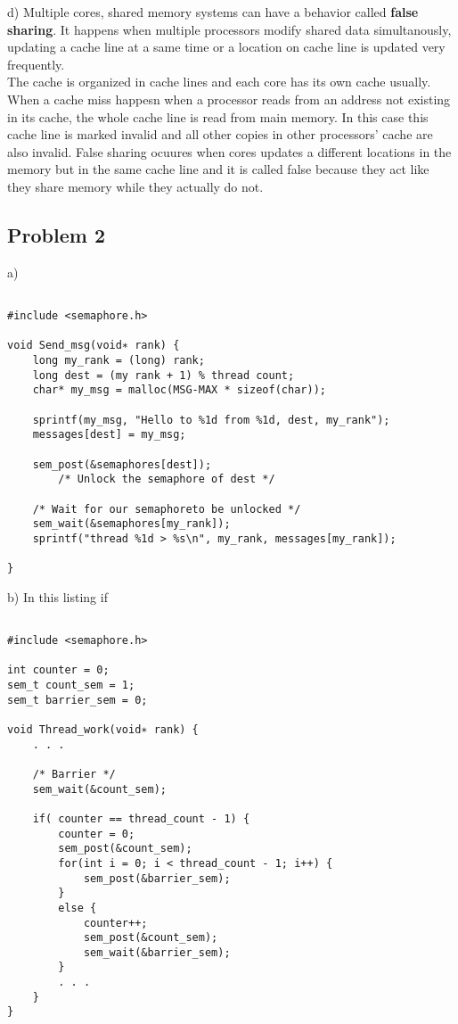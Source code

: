 \documentclass{article}
\begin{document}
\begin{flushleft}
d) Multiple cores, shared memory systems can have a behavior called \textbf{false sharing}. It happens when multiple processors modify shared data simultanously, updating a cache line at a same time or a location on cache line is updated very frequently. \\ 
The cache is organized in cache lines and each core has its own cache usually. When a cache miss happesn when a processor reads from an address not existing in its cache, the whole cache line is read from main memory. In this case this cache line is marked invalid and all other copies in other processors' cache are also invalid. False sharing ocuures when cores updates a different locations in the memory but in the same cache line and it is called false because they act like they share memory while they actually do not.
\end{flushleft}
\newpage

\subsection{Problem 2}
a)
\begin{lstlisting}

#include <semaphore.h>

void Send_msg(void∗ rank) {
    long my_rank = (long) rank;
    long dest = (my rank + 1) % thread count;
    char* my_msg = malloc(MSG-MAX * sizeof(char));

    sprintf(my_msg, "Hello to %1d from %1d, dest, my_rank");
    messages[dest] = my_msg;

    sem_post(&semaphores[dest]);
        /* Unlock the semaphore of dest */

    /* Wait for our semaphoreto be unlocked */    
    sem_wait(&semaphores[my_rank]);
    sprintf("thread %1d > %s\n", my_rank, messages[my_rank]);

}

\end{lstlisting}
\newpage
b) In this listing if 
\begin{lstlisting}

#include <semaphore.h>

int counter = 0;
sem_t count_sem = 1;
sem_t barrier_sem = 0;

void Thread_work(void∗ rank) {
    . . .

    /* Barrier */
    sem_wait(&count_sem);

    if( counter == thread_count - 1) {
        counter = 0;
        sem_post(&count_sem);
        for(int i = 0; i < thread_count - 1; i++) {
            sem_post(&barrier_sem);
        }
        else {
            counter++;
            sem_post(&count_sem);
            sem_wait(&barrier_sem);
        }
        . . .
    }
}
\end{lstlisting}
\end{document}

